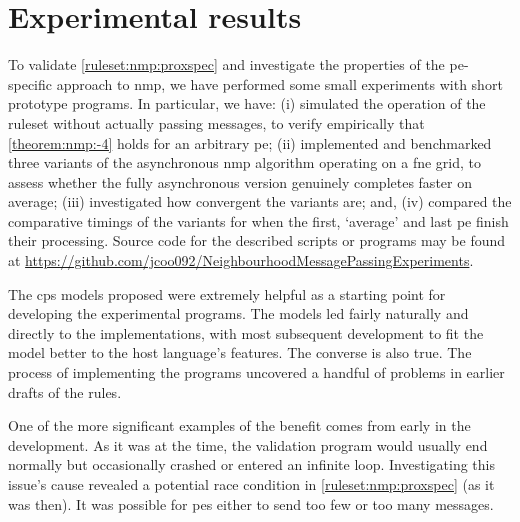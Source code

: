\section{Experimental results}


To validate \cref{ruleset:nmp:proxspec} and investigate the properties of the \gls{pe}-specific approach to \gls{nmp}, we have performed some small experiments with short prototype programs.  In particular, we have:  (i) simulated the operation of the ruleset without actually passing messages, to verify empirically that \cref{theorem:nmp:-4} holds for an arbitrary \gls{pe};  (ii) implemented and benchmarked three variants of the asynchronous \gls{nmp} algorithm operating on a \gls{fne} grid, to assess whether the fully asynchronous version genuinely completes faster on average; (iii) investigated how convergent the variants are; and, (iv) compared the comparative timings of the variants for when the first, `average' and last \gls{pe} finish their processing.  Source code for the described scripts or programs may be found at \url{https://github.com/jcoo092/NeighbourhoodMessagePassingExperiments}.

The \gls{cps} models proposed were extremely helpful as a starting point for developing the experimental programs.  The models led fairly naturally and directly to the implementations, with most subsequent development to fit the model better to the host language's features.  The converse is also true.  The process of implementing the programs uncovered a handful of problems in earlier drafts of the rules.

One of the more significant examples of the benefit comes from early in the development.  As it was at the time, the validation program would usually end normally but occasionally crashed or entered an infinite loop.  Investigating this issue's cause revealed a potential race condition in \cref{ruleset:nmp:proxspec} (as it was then).  It was possible for \glspl{pe} either to send too few or too many messages.

